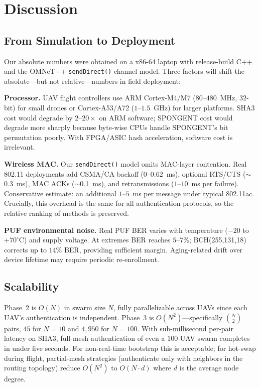 \documentclass[journal,a4paper,10pt]{IEEEtran}
\begin{document}
\section{Discussion}
\label{sec:discussion}

\subsection{From Simulation to Deployment}
Our absolute numbers were obtained on a x86-64 laptop with
release-build C++ and the OMNeT++ \texttt{sendDirect()} channel model.
Three factors will shift the absolute---but not relative---numbers in
field deployment:

\textbf{Processor.} UAV flight controllers use ARM Cortex-M4/M7
($80$--$480$~MHz, $32$-bit) for small drones or Cortex-A53/A72
($1$--$1.5$~GHz) for larger platforms. SHA3 cost would degrade by
$2$--$20\times$ on ARM software; SPONGENT cost would degrade more
sharply because byte-wise CPUs handle SPONGENT's bit permutation
poorly. With FPGA/ASIC hash acceleration, software cost is
irrelevant.

\textbf{Wireless MAC.} Our \texttt{sendDirect()} model omits MAC-layer
contention. Real 802.11 deployments add CSMA/CA backoff
($0$--$0.62$~ms), optional RTS/CTS ($\sim$0.3~ms), MAC ACKs
($\sim$0.1~ms), and retransmissions ($1$--$10$~ms per failure).
Conservative estimate: an additional $1$--$5$~ms per message under
typical 802.11ac. Crucially, this overhead is the same for all
authentication protocols, so the relative ranking of methods is
preserved.

\textbf{PUF environmental noise.} Real PUF BER varies with temperature
($-20$ to $+70^\circ$C) and supply voltage. At extremes BER reaches
$5$--$7\%$; BCH(255,131,18) corrects up to $14\%$ BER, providing
sufficient margin. Aging-related drift over device lifetime may
require periodic re-enrollment.

\subsection{Scalability}
Phase~2 is $O(N)$ in swarm size $N$, fully parallelizable across UAVs
since each UAV's authentication is independent. Phase~3 is
$O(N^2)$---specifically $\binom{N}{2}$ pairs, $45$ for $N{=}10$ and
$4{,}950$ for $N{=}100$. With sub-millisecond per-pair latency on
SHA3, full-mesh authentication of even a $100$-UAV swarm completes in
under five seconds. For non-real-time bootstrap this is acceptable;
for hot-swap during flight, partial-mesh strategies (authenticate
only with neighbors in the routing topology) reduce $O(N^2)$ to
$O(N \cdot d)$ where $d$ is the average node degree.
\end{document}
